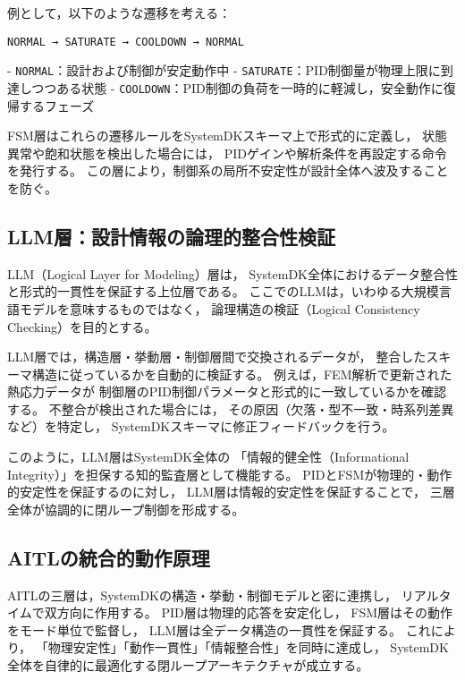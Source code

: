例として，以下のような遷移を考える：

\begin{center}
\texttt{NORMAL → SATURATE → COOLDOWN → NORMAL}
\end{center}

- \texttt{NORMAL}：設計および制御が安定動作中  
- \texttt{SATURATE}：PID制御量が物理上限に到達しつつある状態  
- \texttt{COOLDOWN}：PID制御の負荷を一時的に軽減し，安全動作に復帰するフェーズ  

FSM層はこれらの遷移ルールをSystemDKスキーマ上で形式的に定義し，
状態異常や飽和状態を検出した場合には，
PIDゲインや解析条件を再設定する命令を発行する。
この層により，制御系の局所不安定性が設計全体へ波及することを防ぐ。

\subsection{LLM層：設計情報の論理的整合性検証}
LLM（Logical Layer for Modeling）層は，
SystemDK全体におけるデータ整合性と形式的一貫性を保証する上位層である。
ここでのLLMは，いわゆる大規模言語モデルを意味するものではなく，
論理構造の検証（Logical Consistency Checking）を目的とする。

LLM層では，構造層・挙動層・制御層間で交換されるデータが，
整合したスキーマ構造に従っているかを自動的に検証する。
例えば，FEM解析で更新された熱応力データが
制御層のPID制御パラメータと形式的に一致しているかを確認する。
不整合が検出された場合には，
その原因（欠落・型不一致・時系列差異など）を特定し，
SystemDKスキーマに修正フィードバックを行う。

このように，LLM層はSystemDK全体の
「情報的健全性（Informational Integrity）」を担保する知的監査層として機能する。
PIDとFSMが物理的・動作的安定性を保証するのに対し，
LLM層は情報的安定性を保証することで，
三層全体が協調的に閉ループ制御を形成する。

\subsection{AITLの統合的動作原理}
AITLの三層は，SystemDKの構造・挙動・制御モデルと密に連携し，
リアルタイムで双方向に作用する。
PID層は物理的応答を安定化し，
FSM層はその動作をモード単位で監督し，
LLM層は全データ構造の一貫性を保証する。
これにより，
「物理安定性」「動作一貫性」「情報整合性」を同時に達成し，
SystemDK全体を自律的に最適化する閉ループアーキテクチャが成立する。
